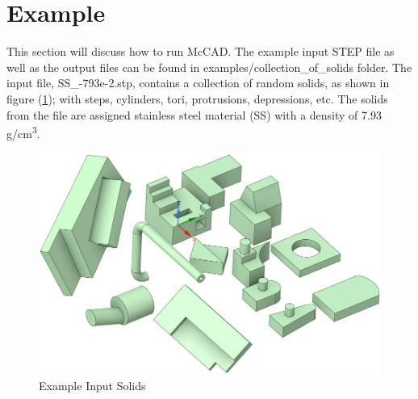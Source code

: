 \documentclass[12pt, a4paper, titlepage]{article}
\begin{document}
\section{Example} \label{sec:Example}
This section will discuss how to run McCAD. The example input STEP file as well as the output files can be found in examples/collection\_of\_solids folder. The input file, SS\_-793e-2.stp, contains a collection of random solids, as shown in figure (\ref{fig:ExampleSolids}); with steps, cylinders, tori, protrusions, depressions, etc. The solids from the file are assigned stainless steel material (SS) with a density of 7.93 g/cm\textsuperscript{3}.
\begin{figure}[h!]
	\centering
	\includegraphics[scale=0.42]{figures/InputSolids.png}
	\caption{Example Input Solids}
	\label{fig:ExampleSolids}
\end{figure}
\end{document}
